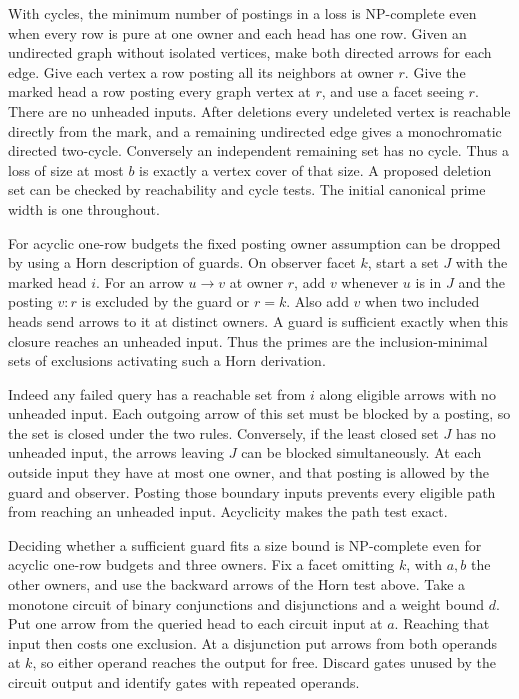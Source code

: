With cycles, the minimum number of postings in a
loss is NP-complete even when every row is pure
at one owner and each head has one row. Given an
undirected graph without isolated vertices, make
both directed arrows for each edge. Give each
vertex a row posting all its neighbors at owner
$r$. Give the marked head a row posting every
graph vertex at $r$, and use a facet seeing $r$.
There are no unheaded inputs. After deletions
every undeleted vertex is reachable directly
from the mark, and a remaining undirected
edge gives a monochromatic directed two-cycle.
Conversely an independent remaining set has
no cycle. Thus a loss of size at most $b$
is exactly a vertex cover of that size.
A proposed deletion set can be checked by
reachability and cycle tests. The initial
canonical prime width is one throughout.

For acyclic one-row budgets the fixed posting owner
assumption can be dropped by using a Horn description
of guards. On observer facet $k$, start a set $J$
with the marked head $i$. For an arrow $u\to v$ at
owner $r$, add $v$ whenever $u$ is in $J$ and the
posting $v:r$ is excluded by the guard or $r=k$.
Also add $v$ when two included heads send arrows
to it at distinct owners. A guard is sufficient
exactly when this closure reaches an unheaded
input. Thus the primes are the inclusion-minimal
sets of exclusions activating such a Horn derivation.

Indeed any failed query has a reachable set from
$i$ along eligible arrows with no unheaded input.
Each outgoing arrow of this set must be blocked
by a posting, so the set is closed under the two
rules. Conversely, if the least closed set $J$
has no unheaded input, the arrows leaving $J$
can be blocked simultaneously. At each outside
input they have at most one owner, and that
posting is allowed by the guard and observer.
Posting those boundary inputs prevents every
eligible path from reaching an unheaded input.
Acyclicity makes the path test exact.

Deciding whether a sufficient guard fits a size bound is NP-complete
even for acyclic one-row budgets and three owners.
Fix a facet omitting $k$, with $a,b$ the other owners,
and use the backward arrows of the Horn test above.
Take a monotone circuit of binary conjunctions and
disjunctions and a weight bound $d$. Put one arrow
from the queried head to each circuit input at $a$.
Reaching that input then costs one exclusion. At a
disjunction put arrows from both operands at $k$,
so either operand reaches the output for free.
Discard gates unused by the circuit output and
identify gates with repeated operands.

